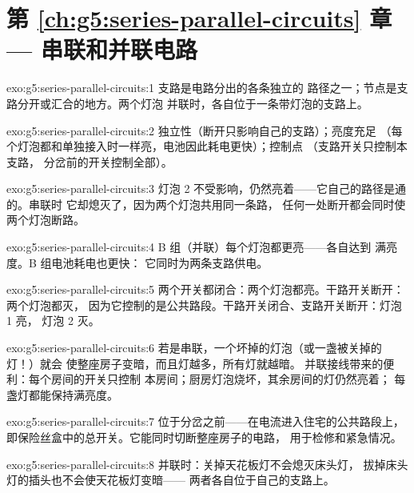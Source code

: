 \section*{第 \ref{ch:g5:series-parallel-circuits} 章 --- 串联和并联电路}

\begin{solution}{exo:g5:series-parallel-circuits:1}
支路是电路分出的各条独立的
路径之一；节点是支路分开或汇合的地方。两个灯泡
并联时，各自位于一条带灯泡的支路上。
\end{solution}

\begin{solution}{exo:g5:series-parallel-circuits:2}
独立性（断开只影响自己的支路）；亮度充足
（每个灯泡都和单独接入时一样亮，电池因此耗电更快）；控制点
（支路开关只控制本支路，
分岔前的开关控制全部）。
\end{solution}

\begin{solution}{exo:g5:series-parallel-circuits:3}
灯泡 2 不受影响，仍然亮着——它自己的路径是通的。串联时
它却熄灭了，因为两个灯泡共用同一条路，
任何一处断开都会同时使两个灯泡断路。
\end{solution}

\begin{solution}{exo:g5:series-parallel-circuits:4}
B 组（并联）每个灯泡都更亮——各自达到
满亮度。B 组电池耗电也更快：
它同时为两条支路供电。
\end{solution}

\begin{solution}{exo:g5:series-parallel-circuits:5}
两个开关都闭合：两个灯泡都亮。干路开关断开：两个灯泡都灭，
因为它控制的是公共路段。干路开关闭合、支路开关断开：灯泡 1 亮，
灯泡 2 灭。
\end{solution}

\begin{solution}{exo:g5:series-parallel-circuits:6}
若是串联，一个坏掉的灯泡（或一盏被关掉的灯！）就会
使整座房子变暗，而且灯越多，所有灯就越暗。
并联接线带来的便利：每个房间的开关只控制
本房间；厨房灯泡烧坏，其余房间的灯仍然亮着；
每盏灯都能保持满亮度。
\end{solution}

\begin{solution}{exo:g5:series-parallel-circuits:7}
位于分岔之前——在电流进入住宅的公共路段上，
即保险丝盒中的总开关。它能同时切断整座房子的电路，
用于检修和紧急情况。
\end{solution}

\begin{solution}{exo:g5:series-parallel-circuits:8}
并联时：关掉天花板灯不会熄灭床头灯，
拔掉床头灯的插头也不会使天花板灯变暗——
两者各自位于自己的支路上。
\end{solution}

